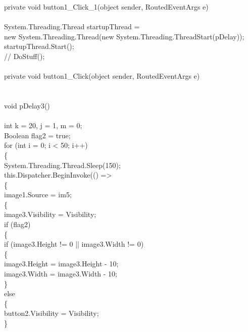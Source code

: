 {        private void button1_Click_1(object sender, RoutedEventArgs e)\\
        {\\
            
            System.Threading.Thread startupThread =\\
                              new System.Threading.Thread(new System.Threading.ThreadStart(pDelay));\\
            startupThread.Start();\\
           // DoStuff();\\
        }\\
        private void button1_Click(object sender, RoutedEventArgs e)\\
        {\\
            
           
    
        }\\
        void pDelay3()\\
        {\\
            int k = 20, j = 1, m = 0;\\
            Boolean flag2 = true;\\
            for (int i = 0; i < 50; i++)\\
            \{\\
                System.Threading.Thread.Sleep(150);\\

                this.Dispatcher.BeginInvoke(() =>\\
               \{\\
                    image1.Source = im5;\\

                    \{\\
                        image3.Visibility = Visibility;\\
                        if (flag2)\\
                        \{\\
                            if (image3.Height != 0 || image3.Width != 0)\\
                            \{\\
                                image3.Height = image3.Height - 10;\\
                                image3.Width = image3.Width - 10;\\
                            \}\\
                            else\\
                           \{\\
                                button2.Visibility = Visibility;\\
                            \}\\
                            
}}
